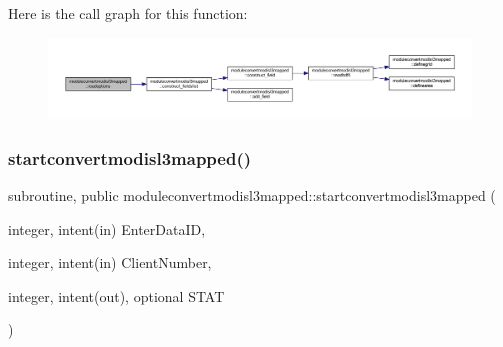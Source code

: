 Here is the call graph for this function\+:\nopagebreak
\begin{figure}[H]
\begin{center}
\leavevmode
\includegraphics[width=350pt]{namespacemoduleconvertmodisl3mapped_a0f034c5b727c268c416d8c9dfec265e3_cgraph}
\end{center}
\end{figure}
\mbox{\label{namespacemoduleconvertmodisl3mapped_a18d5802527fa5553ab45a5c110557d2b}} 
\subsubsection{\texorpdfstring{startconvertmodisl3mapped()}{startconvertmodisl3mapped()}}
{\footnotesize\ttfamily subroutine, public moduleconvertmodisl3mapped\+::startconvertmodisl3mapped (\begin{DoxyParamCaption}\item[{integer, intent(in)}]{Enter\+Data\+ID,  }\item[{integer, intent(in)}]{Client\+Number,  }\item[{integer, intent(out), optional}]{S\+T\+AT }\end{DoxyParamCaption})}

